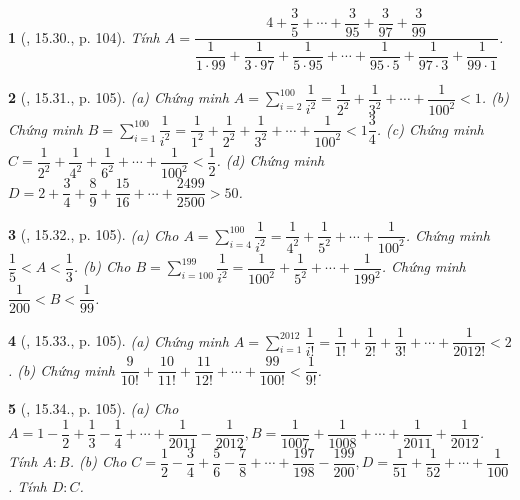 \documentclass{article}
\newtheorem{baitoan}{}
\begin{document}
\begin{baitoan}[\cite{TLCT_THCS_Toan_6_so_hoc}, 15.30., p. 104]
	Tính $A = \dfrac{4 + \dfrac{3}{5} + \cdots + \dfrac{3}{95} + \dfrac{3}{97} + \dfrac{3}{99}}{\dfrac{1}{1\cdot99} + \dfrac{1}{3\cdot97} + \dfrac{1}{5\cdot95} + \cdots + \dfrac{1}{95\cdot5} + \dfrac{1}{97\cdot3} + \dfrac{1}{99\cdot1}}$.
\end{baitoan}

\begin{baitoan}[\cite{TLCT_THCS_Toan_6_so_hoc}, 15.31., p. 105]
	(a) Chứng minh $A = \sum_{i=2}^{100} \dfrac{1}{i^2} = \dfrac{1}{2^2} + \dfrac{1}{3^2} + \cdots + \dfrac{1}{100^2} < 1$. (b) Chứng minh $B = \sum_{i=1}^{100} \dfrac{1}{i^2} = \dfrac{1}{1^2} + \dfrac{1}{2^2} + \dfrac{1}{3^2} + \cdots + \dfrac{1}{100^2} < 1\dfrac{3}{4}$. (c) Chứng minh $C = \dfrac{1}{2^2} + \dfrac{1}{4^2} + \dfrac{1}{6^2} + \cdots + \dfrac{1}{100^2} < \dfrac{1}{2}$. (d) Chứng minh $D = 2 + \dfrac{3}{4} + \dfrac{8}{9} + \dfrac{15}{16} + \cdots + \dfrac{2499}{2500} > 50$.
\end{baitoan}

\begin{baitoan}[\cite{TLCT_THCS_Toan_6_so_hoc}, 15.32., p. 105]
	(a) Cho $A = \sum_{i=4}^{100} \dfrac{1}{i^2} = \dfrac{1}{4^2} + \dfrac{1}{5^2} + \cdots + \dfrac{1}{100^2}$. Chứng minh $\dfrac{1}{5} < A < \dfrac{1}{3}$. (b) Cho $B = \sum_{i=100}^{199} \dfrac{1}{i^2} = \dfrac{1}{100^2} + \dfrac{1}{5^2} + \cdots + \dfrac{1}{199^2}$. Chứng minh $\dfrac{1}{200} < B < \dfrac{1}{99}$.
\end{baitoan}

\begin{baitoan}[\cite{TLCT_THCS_Toan_6_so_hoc}, 15.33., p. 105]
	(a) Chứng minh $A = \sum_{i=1}^{2012} \dfrac{1}{i!} = \dfrac{1}{1!} + \dfrac{1}{2!} + \dfrac{1}{3!} + \cdots + \dfrac{1}{2012!} < 2$. (b) Chứng minh $\dfrac{9}{10!} + \dfrac{10}{11!} + \dfrac{11}{12!} + \cdots + \dfrac{99}{100!} < \dfrac{1}{9!}$.
\end{baitoan}

\begin{baitoan}[\cite{TLCT_THCS_Toan_6_so_hoc}, 15.34., p. 105]
	(a) Cho $A = 1 - \dfrac{1}{2} + \dfrac{1}{3} - \dfrac{1}{4} + \cdots + \dfrac{1}{2011} - \dfrac{1}{2012},B = \dfrac{1}{1007} + \dfrac{1}{1008} + \cdots + \dfrac{1}{2011} + \dfrac{1}{2012}$. Tính $A:B$. (b) Cho $C = \dfrac{1}{2} - \dfrac{3}{4} + \dfrac{5}{6} - \dfrac{7}{8} + \cdots + \dfrac{197}{198} - \dfrac{199}{200},D = \dfrac{1}{51} + \dfrac{1}{52} + \cdots + \dfrac{1}{100}$. Tính $D:C$.
\end{baitoan}
\end{document}
